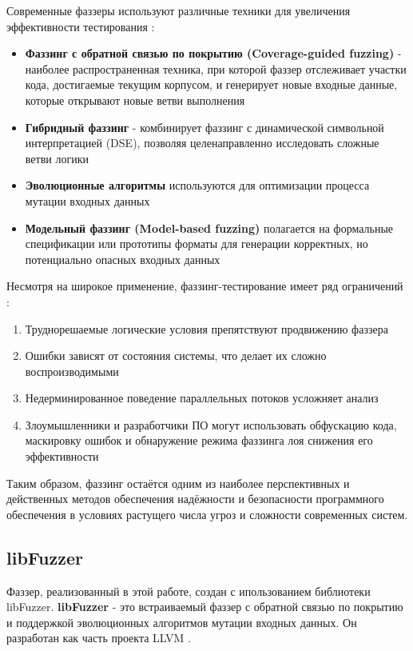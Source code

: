 Современные фаззеры используют различные техники для увеличения эффективности тестирования \cite{Kuliamin}\cite{Boehme}:
\begin{itemize}
	\item \textbf{Фаззинг с обратной связью по покрытию (Coverage-guided fuzzing)} - наиболее распространенная техника, при которой фаззер отслеживает участки кода, достигаемые текущим корпусом, и генерирует новые входные данные, которые открывают новые ветви выполнения
	\item \textbf{Гибридный фаззинг} - комбинирует фаззинг с динамической символьной интерпретацией (DSE), позволяя целенаправленно исследовать сложные ветви логики
	\item \textbf{Эволюционные алгоритмы} используются для оптимизации процесса мутации входных данных
	\item \textbf{Модельный фаззинг (Model-based fuzzing)} полагается на формальные спецификации или прототипы форматы для генерации корректных, но потенциально опасных входных данных
\end{itemize}

Несмотря на широкое применение, фаззинг-тестирование имеет ряд ограничений \cite{Kuliamin}\cite{Boehme}:
\begin{enumerate}
	\item Труднорешаемые логические условия препятствуют продвижению фаззера
	\item Ошибки зависят от состояния системы, что делает их сложно воспроизводимыми
	\item Недерминированное поведение параллельных потоков усложняет анализ
	\item Злоумышленники и разработчики ПО могут использовать обфускацию кода, маскировку ошибок и обнаружение режима фаззинга лоя снижения его эффективности
\end{enumerate}

Таким образом, фаззинг остаётся одним из наиболее перспективных и действенных методов обеспечения надёжности и безопасности программного обеспечения в условиях растущего числа угроз и сложности современных систем.

\subsection{libFuzzer}
Фаззер, реализованный в этой работе, создан с ипользованием библиотеки libFuzzer. \textbf{libFuzzer} - это встраиваемый фаззер с обратной связью по покрытию и поддержкой эволюционных алгоритмов мутации входных данных. Он разработан как часть проекта LLVM \cite{Libfuzzer}.

